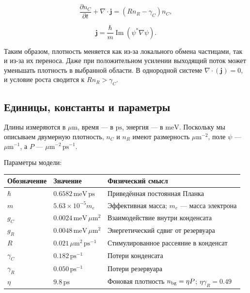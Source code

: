 \documentclass[12pt,a4paper]{article}
\begin{document}
\begin{equation}\label{eq:3}
\frac{\partial n_C}{\partial t}+\nabla\cdot\mathbf j=(Rn_R-\gamma_C)n_C,\end{equation}

\begin{equation}\label{eq:4}
\mathbf j=\frac{\hbar}{m}\operatorname{Im}(\psi^*\nabla\psi).\end{equation}

Таким образом, плотность меняется как из-за локального обмена частицами, так и из-за их переноса. Даже при положительном усилении выходящий поток может уменьшать плотность в выбранной области. В однородной системе $\nabla\cdot(\mathbf j)=0$, и условие роста сводится к $R n_{R}>\gamma_{C}$.

\subsection{Единицы, константы и параметры}\label{sec:2.4}

Длины измеряются в $\mu\mathrm m$, время --- в $\mathrm{ps}$, энергия --- в $\mathrm{meV}$. Поскольку мы описываем двумерную плотность, $n_{C}$ и $n_{R}$ имеют размерность $\mu\mathrm m^{-2}$, поле $\psi$ --- $\mu\mathrm m^{-1}$, а $P$ --- $\mu\mathrm m^{-2}\,\mathrm{ps}^{-1}$.

Параметры модели:

\begin{center}\begin{tabular}{>{\raggedright\arraybackslash}p{}>{\raggedright\arraybackslash}p{}>{\raggedright\arraybackslash}p{}}\toprule

\textbf{Обозначение} & \textbf{Значение} & \textbf{Физический смысл}\\\midrule

$\hbar$ & $0.6582\,\mathrm{meV}\,\mathrm{ps}$ & Приведённая постоянная Планка\\

$m$ & $5.63 \times 10^{-5} m_{e}$ & Эффективная масса; $m_{e}$ --- масса электрона\\

$g_{C}$ & $0.0024\,\mathrm{meV}\,\mu\mathrm m^{2}$ & Взаимодействие внутри конденсата\\

$g_{R}$ & $0.0048\,\mathrm{meV}\,\mu\mathrm m^{2}$ & Энергетический сдвиг от резервуара\\

$R$ & $0.021\,\mu\mathrm m^{2}\,\mathrm{ps}^{-1}$ & Стимулированное рассеяние в конденсат\\

$\gamma_{C}$ & $0.182\,\mathrm{ps}^{-1}$ & Потери конденсата\\

$\gamma_{R}$ & $0.050\,\mathrm{ps}^{-1}$ & Потери резервуара\\

$\eta$ & $9.8\,\mathrm{ps}$ & Фоновая плотность $n_{\rm bg}=\eta P$; $\eta \gamma_{R}=0.49$\\

\bottomrule\end{tabular}\end{center}
\end{document}
